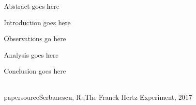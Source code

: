 
\physics

\begin{paperabs}

	Abstract goes here
	
\end{paperabs}

\begin{paper}
	
	
	Introduction goes here

	
	Observations go here
	
	
	Analysis goes here
	

	Conclusion goes here
	

	\\papersource{Serbanescu, R.,The Franck-Hertz Experiment, 2017}

\end{paper}
